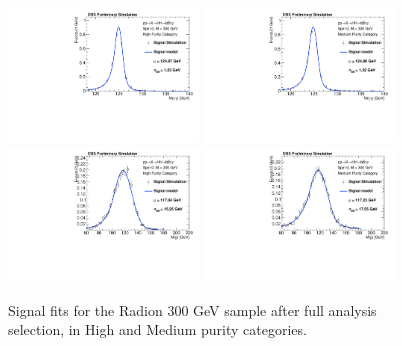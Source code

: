 \begin{figure}[h]
  \centering
  \includegraphics[width=0.45\textwidth]{figures/sec-signals/Rad300_signal_fit_mgg_cat0}\hfil
  \includegraphics[width=0.45\textwidth]{figures/sec-signals/Rad300_signal_fit_mgg_cat1}\hfil
  \includegraphics[width=0.45\textwidth]{figures/sec-signals/Rad300_signal_fit_mjj_cat0}\hfil
  \includegraphics[width=0.45\textwidth]{figures/sec-signals/Rad300_signal_fit_mjj_cat1}\hfil
  \caption{Signal fits for the Radion 300 GeV sample after full analysis selection, in High and Medium purity categories.}
  \label{fig:rad300}
\end{figure}

